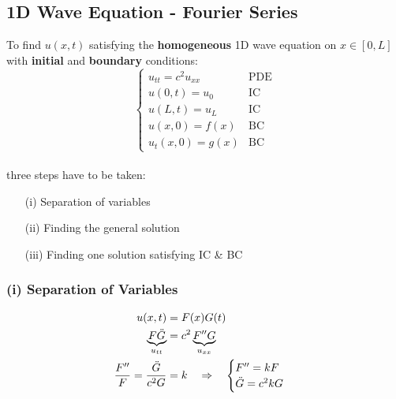 \subsection{1D Wave Equation - Fourier Series}
To find $u(x,t)$ satisfying the \textbf{homogeneous} 1D wave equation on $x\in[0,L]$ with \textbf{initial} and 
\textbf{boundary} conditions:
\begin{equation*}
    \begin{cases} 
        u_{tt}=c^2u_{xx} & \text{PDE}\\
        u(0,t)=u_0 & \text{IC}\\ 
        u(L,t)=u_L & \text{IC}\\ 
        u(x,0)=f(x)& \text{BC}\\ 
        u_t(x,0)=g(x)& \text{BC}
    \end{cases}
\end{equation*}\\
three steps have to be taken:
\begin{itemize}
    \item[(i)] Separation of variables
    \item[(ii)] Finding the general solution
    \item[(iii)] Finding one solution satisfying IC \& BC
\end{itemize}
%
%

\subsubsection{(i) Separation of Variables}
\begin{align*}
    u(x,t)&=F(x)G(t)\\
    \underbrace{F\ddot{G}}_{u_{tt}}&=c^2\underbrace{F''G}_{u_{xx}}\\
    \frac{F''}{F}=\frac{\ddot{G}}{c^2G}&=k\hspace*{10pt}\Rightarrow\hspace*{10pt}
    \begin{cases} 
        F''=kF\\
        \ddot{G}=c^2kG
    \end{cases}
\end{align*}
%
%
